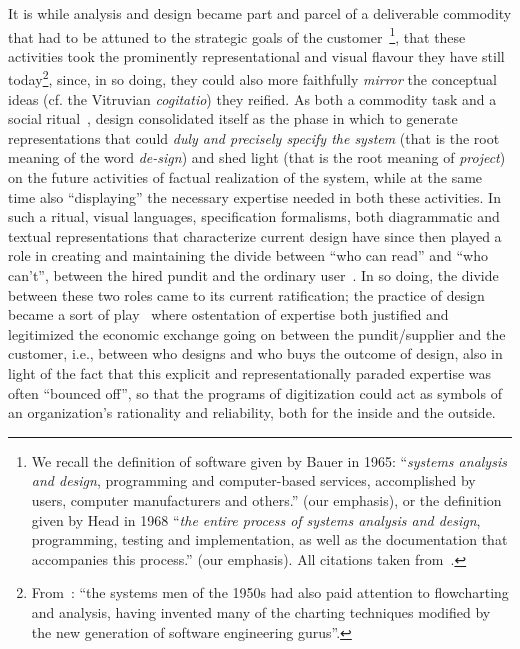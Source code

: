 \documentclass{article}
\begin{document}
It is while analysis and design became part and parcel of a deliverable commodity that had to be attuned to the strategic goals of the customer~\citep{haigh_software_2002}\footnote{We recall the definition of software given by Bauer in 1965: ``\emph{systems analysis and design}, programming and computer-based services, accomplished by users, computer manufacturers and others.'' (our emphasis), or the definition given by Head in 1968 ``\emph{the entire process of systems analysis and design}, programming, testing and implementation, as well as the documentation that accompanies this process.'' (our emphasis). All citations taken from~\citep{haigh_software_2002}.}, that these activities took the prominently representational and visual flavour they have still today\footnote{From~\citep{haigh_crisis_2010}: ``the systems men of the 1950s had also paid attention to flowcharting and analysis, having invented many of the charting techniques modified by the new generation of software engineering gurus''.}, since, in so doing, they could also more faithfully \emph{mirror} the conceptual ideas (cf. the Vitruvian \emph{cogitatio}) they reified. As both a commodity task and a social ritual~\citep{robey_rituals_1984}, design consolidated itself as the phase in which to generate representations that could \emph{duly and precisely specify the system} (that is the root meaning of the word \emph{de-sign}) and shed light (that is the root meaning of \emph{project}) on the future activities of factual realization of the system, while at the same time also ``displaying'' the necessary expertise needed in both these activities.
In such a ritual, visual languages, specification formalisms, both diagrammatic and textual representations that characterize current design have since then played a role in creating and maintaining the divide between ``who can read'' and ``who can't'', between the hired pundit and the ordinary user~\citep{illich_disabling_1977}. In so doing, the divide between these two roles came to its current ratification; the practice of design became a sort of play~\citep{nandhakumar_fiction_1999} where ostentation of expertise both justified and legitimized the economic exchange going on between the pundit/supplier and the customer, i.e., between who designs and who buys the outcome of design, also in light of the fact that this explicit and representationally paraded expertise was often ``bounced off'', so that the programs of digitization could act as symbols of an organization's rationality and reliability, both for the inside and the outside. 
\end{document}
